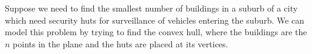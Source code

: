 Suppose we need to find the smallest number of buildings in a suburb
of a city which
need security huts for surveillance of vehicles entering the suburb.
We can model this
problem by trying to find the convex hull, where the buildings are the $n$
points in the plane and the huts are placed at its vertices.

